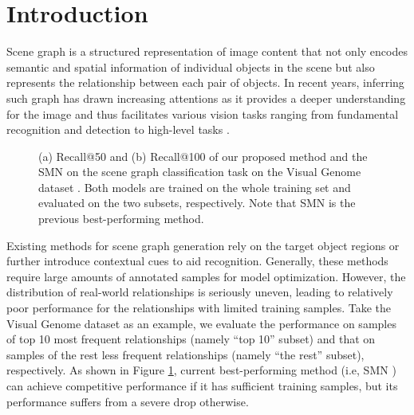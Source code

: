 \documentclass[10pt,twocolumn,letterpaper]{article}
\begin{document}
\section{Introduction}
Scene graph \cite{johnson2015image} is a structured representation of image content that not only encodes semantic and spatial information of individual objects in the scene but also represents the relationship between each pair of objects. In recent years, inferring such graph has drawn increasing attentions \cite{xu2017scene,dai2017detecting} as it provides a deeper understanding for the image and thus facilitates various vision tasks ranging from fundamental recognition and detection \cite{marino2017more,fang2017object} to high-level tasks \cite{zitnick2013learning,yatskar2016situation}. 

\begin{figure}[!t]
\centering
{}
\caption{(a) Recall@50 and (b) Recall@100 of our proposed method and the SMN \cite{zellers2017neural} on the scene graph classification task on the Visual Genome dataset \cite{krishna2017visual}. Both models are trained on the whole training set and evaluated on the two subsets, respectively. Note that SMN is the previous best-performing method.}
\label{fig:spilt-evaluation}
\end{figure}

Existing methods for scene graph generation rely on the target object regions \cite{lu2016visual, dai2017detecting} or further introduce contextual cues \cite{xu2017scene,zellers2017neural} to aid recognition. Generally, these methods require large amounts of annotated samples for model optimization. However, the distribution of real-world relationships is seriously uneven, leading to relatively poor performance for the relationships with limited training samples. Take the Visual Genome dataset \cite{krishna2017visual} as an example, we evaluate the performance on samples of top 10 most frequent relationships (namely ``top 10'' subset) and that on samples of the rest less frequent relationships (namely ``the rest'' subset), respectively. As shown in Figure \ref{fig:spilt-evaluation}, current best-performing method (i.e, SMN \cite{zellers2017neural}) can achieve competitive performance if it has sufficient training samples, but its performance suffers from a severe drop otherwise.
\end{document}
